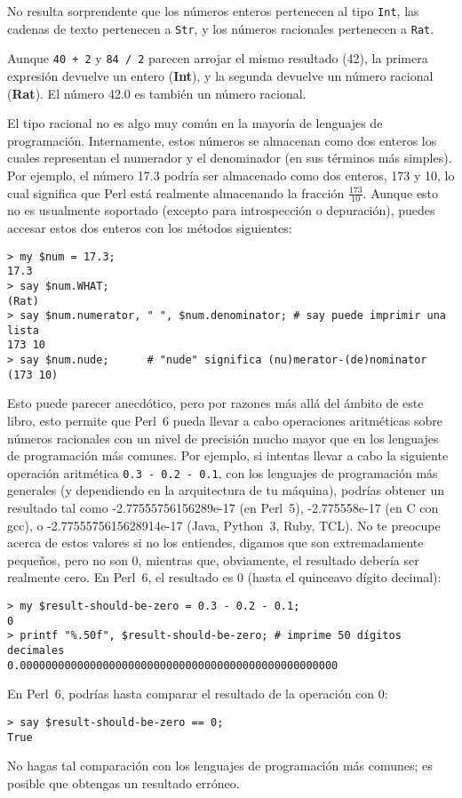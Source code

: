No resulta sorprendente que los números enteros pertenecen al tipo
{\tt Int}, las cadenas de texto pertenecen a {\tt Str}, y los números racionales
pertenecen a {\tt Rat}. 

Aunque {\tt 40 + 2} y {\tt 84 / 2} parecen arrojar el mismo resultado (42),
la primera expresión devuelve un entero ({\bf Int}), y la segunda devuelve
un número racional ({\bf Rat}). El número 42.0 es también un número racional.

El tipo racional no es algo muy común en la mayoría de lenguajes de programación.
Internamente, estos números se almacenan como dos enteros los cuales representan
el numerador y el denominador (en sus términos más simples). Por ejemplo, el número
17.3 podría ser almacenado como dos enteros, 173 y 10, lo cual significa que
Perl está realmente almacenando la fracción $\frac{173}{10}$. Aunque esto no es 
usualmente soportado (excepto para introspección o depuración), puedes accesar estos
dos enteros con los métodos siguientes:

\begin{verbatim}
> my $num = 17.3;
17.3
> say $num.WHAT;
(Rat)
> say $num.numerator, " ", $num.denominator; # say puede imprimir una lista
173 10
> say $num.nude;      # "nude" significa (nu)merator-(de)nominator
(173 10) 
\end{verbatim}
%
Esto puede parecer anecdótico, pero por razones más allá del
ámbito de este libro, esto permite que Perl~6 pueda llevar a cabo 
operaciones aritméticas sobre números racionales con un nivel 
de precisión mucho mayor que en los lenguajes de programación más comunes.
Por ejemplo, si intentas llevar a cabo la siguiente operación aritmética 
\verb'0.3 - 0.2 - 0.1', con los lenguajes de programación más generales 
(y dependiendo en la arquitectura de tu máquina), podrías obtener un resultado
tal como -2.77555756156289e-17 (en Perl~5), 
-2.775558e-17 (en C con gcc), o -2.7755575615628914e-17 
(Java, Python~3, Ruby, TCL). No te preocupe acerca de estos valores si no
los entiendes, digamos que son extremadamente pequeños, pero no son 0,
mientras que, obviamente, el resultado debería ser realmente cero. En 
Perl~6, el resultado es 0 (hasta el quinceavo dígito decimal):
\begin{verbatim}
> my $result-should-be-zero = 0.3 - 0.2 - 0.1;
0
> printf "%.50f", $result-should-be-zero; # imprime 50 dígitos decimales
0.00000000000000000000000000000000000000000000000000
\end{verbatim}
%
En Perl~6, podrías hasta comparar el resultado de la operación con 0:
\begin{verbatim}
> say $result-should-be-zero == 0;
True
\end{verbatim}
%
No hagas tal comparación con los lenguajes de programación más comunes;
es posible que obtengas un resultado erróneo.


